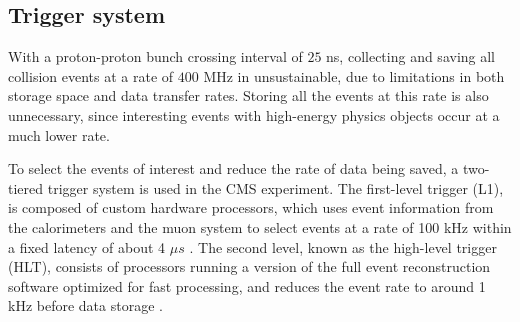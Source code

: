 \subsection{Trigger system}
\label{subsec:trigger_system}

With a proton-proton bunch crossing interval of $25$ ns, collecting and saving all collision events at a rate of $400$ MHz in unsustainable, 
due to limitations in both storage space and data transfer rates. 
Storing all the events at this rate is also unnecessary, since interesting events with high-energy physics objects occur at a much
lower rate.

To select the events of interest and reduce the rate of data being saved, a two-tiered trigger system is used in the CMS experiment. The first-level
trigger (L1), is composed of custom hardware processors, which uses event information from the calorimeters and the muon system to select events at a rate
of 100 kHz within a fixed latency of about 4 $\mu s$ \cite{cms:l1_paper}. The second level, known as the high-level trigger (HLT), consists of processors 
running a version of the full event reconstruction software optimized for fast processing, and reduces the event rate to around 1 kHz before data storage 
\cite{cms:hlt_paper}. 